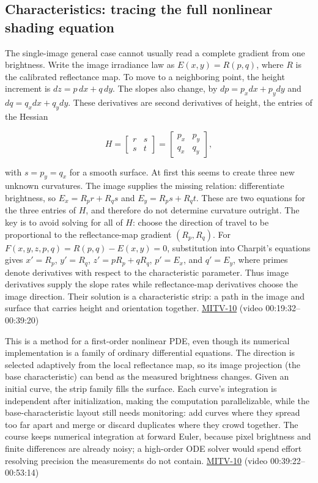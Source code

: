 \subsection{Characteristics: tracing the full nonlinear shading equation}\label{04-visual-computing-ii-ch032-characteristics-tracing-the-full-nonlinear-shading-equation}

The single-image general case cannot usually read a complete gradient from one brightness. Write the image irradiance law as \(E(x,y)=R(p,q)\), where \(R\) is the calibrated reflectance map. To move to a neighboring point, the height increment is \(dz=p\,dx+q\,dy\). The slopes also change, by \(dp=p_xdx+p_ydy\) and \(dq=q_xdx+q_ydy\). These derivatives are second derivatives of height, the entries of the Hessian

\[
H=\begin{bmatrix}r&s\\s&t\end{bmatrix}=\begin{bmatrix}p_x&p_y\\q_x&q_y\end{bmatrix},
\]

with \(s=p_y=q_x\) for a smooth surface. At first this seems to create three new unknown curvatures. The image supplies the missing relation: differentiate brightness, so \(E_x=R_p r+R_qs\) and \(E_y=R_ps+R_qt\). These are two equations for the three entries of \(H\), and therefore do not determine curvature outright. The key is to avoid solving for all of \(H\): choose the direction of travel to be proportional to the reflectance-map gradient \((R_p,R_q)\). For \(F(x,y,z,p,q)=R(p,q)-E(x,y)=0\), substitution into Charpit's equations gives \(x'=R_p\), \(y'=R_q\), \(z'=pR_p+qR_q\), \(p'=E_x\), and \(q'=E_y\), where primes denote derivatives with respect to the characteristic parameter. Thus image derivatives supply the slope rates while reflectance-map derivatives choose the image direction. Their solution is a characteristic strip: a path in the image and surface that carries height and orientation together. \hyperref[04-visual-computing-ii-ch036-mitv-10---characteristic-strip-expansion-shape-from-shading-iterative-solutions]{MITV-10} (video 00:19:32--00:39:20)

This is a method for a first-order nonlinear PDE, even though its numerical implementation is a family of ordinary differential equations. The direction is selected adaptively from the local reflectance map, so its image projection (the base characteristic) can bend as the measured brightness changes. Given an initial curve, the strip family fills the surface. Each curve's integration is independent after initialization, making the computation parallelizable, while the base-characteristic layout still needs monitoring: add curves where they spread too far apart and merge or discard duplicates where they crowd together. The course keeps numerical integration at forward Euler, because pixel brightness and finite differences are already noisy; a high-order ODE solver would spend effort resolving precision the measurements do not contain. \hyperref[04-visual-computing-ii-ch036-mitv-10---characteristic-strip-expansion-shape-from-shading-iterative-solutions]{MITV-10} (video 00:39:22--00:53:14)

